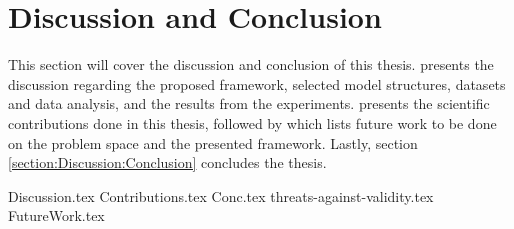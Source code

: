 \chapter{Discussion and Conclusion}

\label{section:Discussion}

This section will cover the discussion and conclusion of this thesis.
 presents the discussion regarding the proposed framework,
selected model structures, datasets and data analysis, and the results from the experiments.
 presents the scientific contributions done in this thesis,
followed by  which lists future work to be done on the problem space and the presented framework.
Lastly, section \ref{section:Discussion:Conclusion} concludes the thesis.


{Discussion.tex}
{Contributions.tex}
{Conc.tex}
{threats-against-validity.tex}
{FutureWork.tex}
